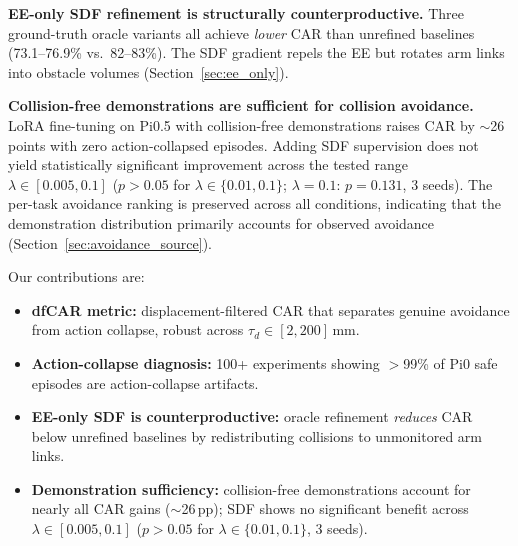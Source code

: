\textbf{EE-only SDF refinement is structurally counterproductive.} Three ground-truth oracle variants all achieve \emph{lower} CAR than unrefined baselines (73.1--76.9\% vs.\ 82--83\%). The SDF gradient repels the EE but rotates arm links into obstacle volumes (Section~\ref{sec:ee_only}).

\textbf{Collision-free demonstrations are sufficient for collision avoidance.} LoRA fine-tuning on Pi0.5 with collision-free demonstrations raises CAR by ${\sim}$26 points with zero action-collapsed episodes. Adding SDF supervision does not yield statistically significant improvement across the tested range $\lambda \in [0.005, 0.1]$ ($p > 0.05$ for $\lambda \in \{0.01, 0.1\}$; $\lambda = 0.1$: $p = 0.131$, 3 seeds). The per-task avoidance ranking is preserved across all conditions, indicating that the demonstration distribution primarily accounts for observed avoidance (Section~\ref{sec:avoidance_source}).

Our contributions are:
\begin{itemize}[leftmargin=*,itemsep=1pt,topsep=2pt]
    \item \textbf{dfCAR metric:} displacement-filtered CAR that separates genuine avoidance from action collapse, robust across $\tau_d \in [2, 200]$\,mm.
    \item \textbf{Action-collapse diagnosis:} 100+ experiments showing $>$99\% of Pi0 safe episodes are action-collapse artifacts.
    \item \textbf{EE-only SDF is counterproductive:} oracle refinement \emph{reduces} CAR below unrefined baselines by redistributing collisions to unmonitored arm links.
    \item \textbf{Demonstration sufficiency:} collision-free demonstrations account for nearly all CAR gains (${\sim}$26\,pp); SDF shows no significant benefit across $\lambda \in [0.005, 0.1]$ ($p > 0.05$ for $\lambda \in \{0.01, 0.1\}$, 3 seeds).
\end{itemize}